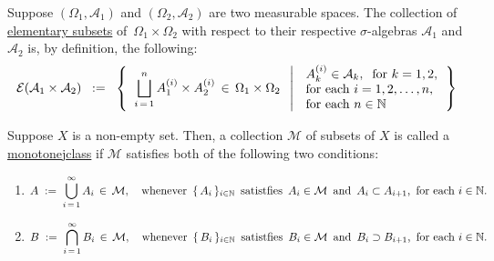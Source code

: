 \begin{definition}
\mbox{}\vskip0.1cm\noindent
Suppose
$\left(\Omega_{1},\mathcal{A}_{1}\right)$ and $\left(\Omega_{2},\mathcal{A}_{2}\right)$
are two measurable spaces.
The collection of \underline{elementary subsets} of \,$\Omega_{1}\times\Omega_{2}$ with respect
to their respective $\sigma$-algebras $\mathcal{A}_{1}$ and $\mathcal{A}_{2}$ is, by definition,
the following: 
\begin{equation*}
\mathcal{E}\!\left(\mathcal{A}_{1}\times\mathcal{A}_{2}\right)
\;\; := \;\;
	\left\{\;\;
	\overset{n}{\underset{i\,=\,1}{\bigsqcup}}\, A_{1}^{(i)} \times A_{2}^{(i)} \,\in\, \Omega_{1}\times\Omega_{2}
	\;\;\left\vert\,\;
	\begin{array}{l}
	A_{k}^{(i)}\in\mathcal{A}_{k}, \;\;\textnormal{for $k = 1, 2$}, \\
	\textnormal{for each $i = 1,2,\ldots,n$}, \\
	\textnormal{for each $n \in \mathbb{N}$}
	\end{array}
	\right.
	\right\}
\end{equation*}
\end{definition}

\begin{definition}
\mbox{}\vskip0.1cm\noindent
Suppose $X$ is a non-empty set.
Then, a collection $\mathcal{M}$ of subsets of $X$ is called a \underline{monotone{{\color{white}j}}class}
if $\mathcal{M}$ satisfies both of the following two conditions:
\begin{enumerate}
\item
	\begin{equation*}
	A \;:=\; \overset{\infty}{\underset{i\,=\,1}{\bigcup}}\, A_{i} \,\in\, \mathcal{M},
	\quad
	\textnormal{whenever \,$\{\,A_{i}\,\}_{i\in\mathbb{N}}$\, satistfies \,$A_{i} \in \mathcal{M}$\,
	and \,$A_{i}\subset A_{i+1}$,\, for each $i \in \mathbb{N}$}.
	\end{equation*}
\item
	\begin{equation*}
	B \;:=\; \overset{\infty}{\underset{i\,=\,1}{\bigcap}}\, B_{i} \,\in\, \mathcal{M},
	\quad
	\textnormal{whenever \,$\{\,B_{i}\,\}_{i\in\mathbb{N}}$\, satistfies \,$B_{i} \in \mathcal{M}$\,
	and \,$B_{i}\supset B_{i+1}$,\, for each $i \in \mathbb{N}$}.
	\end{equation*}
\end{enumerate}
\end{definition}

